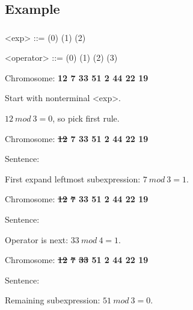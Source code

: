 \documentclass{beamer}
\makeatletter
\newcommand*{\currentname}{\@currentlabelname}
\makeatother
\begin{document}
\subsection{Example}
\begin{frame}
\frametitle{\currentname}
\begin{grammar}
<exp>      ::=       \hfill (0) \hspace{1em}
            \alt {}    					  		\hfill (1) \hspace{1em}
            \alt {}      					  		\hfill (2) \hspace{1em}

<operator> ::=   \lit*{+} 						  		\hfill (0) \hspace{1em}
		    \alt \lit*{-} 						  		\hfill (1) \hspace{1em}
		    \alt \lit*{*} 						  		\hfill (2) \hspace{1em}
		    \alt \lit*{/} 						 		\hfill (3) \hspace{1em}

\end{grammar}

\begin{itemize}

	{	
		\item Chromosome: \textbf{12 7 33 51 2 44 22 19}
		\item Start with nonterminal <exp>.
		\item $12\ mod\ 3 = 0$, so pick first rule.
	}

	{	
		\item Chromosome: \textbf{\sout{12} 7 33 51 2 44 22 19}
		\item Sentence:   
		\item First expand leftmost subexpression: $7\ mod\ 3 = 1$.
	}

	{		
		\item Chromosome: \textbf{\sout{12} \sout{7} 33 51 2 44 22 19}
		\item Sentence:   
		\item Operator is next: $33\ mod\ 4 = 1$.
	}

	{		
		\item Chromosome: \textbf{\sout{12} \sout{7} \sout{33} 51 2 44 22 19}
		\item Sentence:  \lit*{-} 
		\item Remaining subexpression: $51\ mod\ 3 = 0$.
	}


\end{itemize}
\end{frame}
\end{document}
